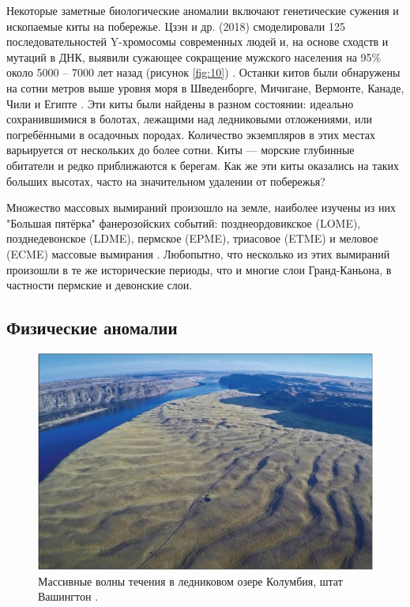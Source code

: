 \documentclass[10pt,twocolumn,letterpaper]{article}
\begin{document}
Некоторые заметные биологические аномалии включают генетические сужения и ископаемые киты на побережье. Цзэн и др. (2018) смоделировали 125 последовательностей Y-хромосомы современных людей и, на основе сходств и мутаций в ДНК, выявили сужающее сокращение мужского населения на 95\% около 5000 – 7000 лет назад (рисунок \ref{fig:10}) \cite{62}. Останки китов были обнаружены на сотни метров выше уровня моря в Шведенборге, Мичигане, Вермонте, Канаде, Чили и Египте \cite{63,64,65,66}. Эти киты были найдены в разном состоянии: идеально сохранившимися в болотах, лежащими над ледниковыми отложениями, или погребёнными в осадочных породах. Количество экземпляров в этих местах варьируется от нескольких до более сотни. Киты — морские глубинные обитатели и редко приближаются к берегам. Как же эти киты оказались на таких больших высотах, часто на значительном удалении от побережья?

Множество массовых вымираний произошло на земле, наиболее изучены из них "Большая пятёрка" фанерозойских событий: позднеордовикское (LOME), позднедевонское (LDME), пермское (EPME), триасовое (ETME) и меловое (ECME) массовые вымирания \cite{88,89}. Любопытно, что несколько из этих вымираний произошли в те же исторические периоды, что и многие слои Гранд-Каньона, в частности пермские и девонские слои.

\subsection{Физические аномалии}

\begin{figure}[b]
\begin{center}
   \includegraphics[width=1\linewidth]{columbia.jpg}
\end{center}
   \caption{Массивные волны течения в ледниковом озере Колумбия, штат Вашингтон \cite{80}.}
\label{fig:11}
\label{fig:onecol}
\end{figure}
\end{document}
